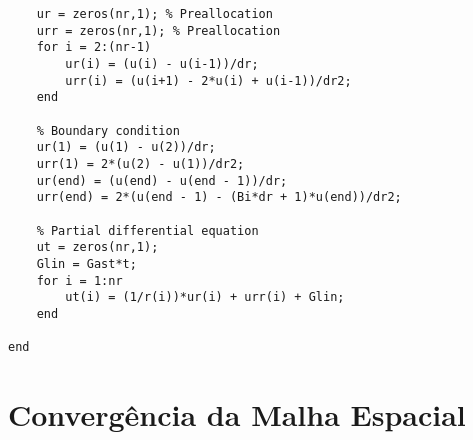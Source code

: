 \begin{lstlisting}
    ur = zeros(nr,1); % Preallocation
	urr = zeros(nr,1); % Preallocation
	for i = 2:(nr-1)
        ur(i) = (u(i) - u(i-1))/dr;
        urr(i) = (u(i+1) - 2*u(i) + u(i-1))/dr2;
	end

	% Boundary condition
    ur(1) = (u(1) - u(2))/dr;
	urr(1) = 2*(u(2) - u(1))/dr2;
    ur(end) = (u(end) - u(end - 1))/dr;
	urr(end) = 2*(u(end - 1) - (Bi*dr + 1)*u(end))/dr2;

    % Partial differential equation
    ut = zeros(nr,1);
    Glin = Gast*t;
    for i = 1:nr
        ut(i) = (1/r(i))*ur(i) + urr(i) + Glin;
    end
  
end
\end{lstlisting}

\section{Convergência da Malha Espacial}

